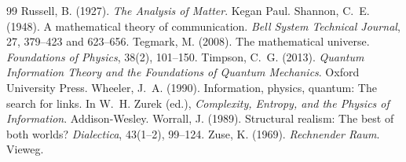 \documentclass{situationist-preprint}
\begin{document}
\begin{thebibliography}{99}
 Russell, B. (1927). \emph{The Analysis of Matter}. Kegan Paul.
 Shannon, C.~E. (1948). A mathematical theory of communication. \emph{Bell System Technical Journal}, 27, 379--423 and 623--656.
 Tegmark, M. (2008). The mathematical universe. \emph{Foundations of Physics}, 38(2), 101--150.
 Timpson, C.~G. (2013). \emph{Quantum Information Theory and the Foundations of Quantum Mechanics}. Oxford University Press.
 Wheeler, J.~A. (1990). Information, physics, quantum: The search for links. In W.~H. Zurek (ed.), \emph{Complexity, Entropy, and the Physics of Information}. Addison-Wesley.
 Worrall, J. (1989). Structural realism: The best of both worlds? \emph{Dialectica}, 43(1--2), 99--124.
 Zuse, K. (1969). \emph{Rechnender Raum}. Vieweg.
\end{thebibliography}
\end{document}
